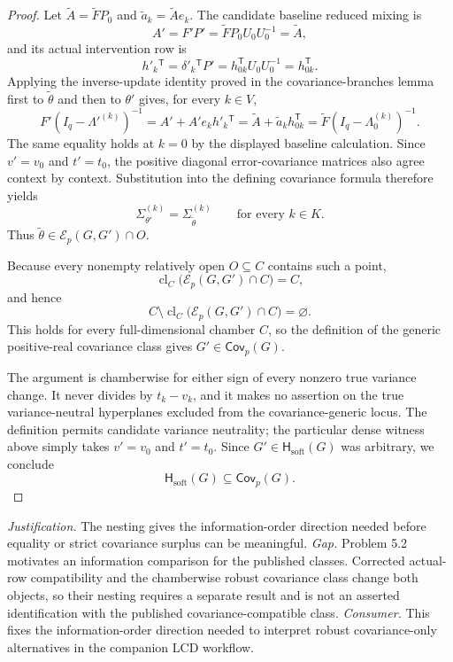 \documentclass{article}
\begin{document}
\begin{proof}
Let \(\widetilde A=\widetilde F P_0\) and \(\widetilde a_k=\widetilde A e_k\).  The candidate baseline reduced mixing is
\[
 A'=F'P'=\widetilde F P_0U_0U_0^{-1}=\widetilde A,
\]
and its actual intervention row is
\[
 h'_k{}^{\mathsf T}
 =\delta'_k{}^{\mathsf T}P'
 =h_{0k}^{\mathsf T}U_0U_0^{-1}
 =h_{0k}^{\mathsf T}.
\]
Applying the inverse-update identity proved in the covariance-branches lemma first to \(\widetilde\theta\) and then to \(\theta'\) gives, for every \(k\in V\),
\[
 F'(I_q-\Lambda'^{(k)})^{-1}
 =A'+A'e_kh'_k{}^{\mathsf T}
 =\widetilde A+\widetilde a_kh_{0k}^{\mathsf T}
 =\widetilde F(I_q-\Lambda^{(k)}_0)^{-1}.
\]
The same equality holds at \(k=0\) by the displayed baseline calculation.  Since \(v'=v_0\) and \(t'=t_0\), the positive diagonal error-covariance matrices also agree context by context.  Substitution into the defining covariance formula therefore yields
\[
 \Sigma_{\theta'}^{(k)}=\Sigma_{\widetilde\theta}^{(k)}
 \qquad\text{for every }k\in K.
\]
Thus \(\widetilde\theta\in\mathcal E_p(G,G')\cap O\).

Because every nonempty relatively open \(O\subseteq C\) contains such a point,
\[
 \operatorname{cl}_{C}\bigl(\mathcal E_p(G,G')\cap C\bigr)=C,
\]
and hence
\[
 C\setminus\operatorname{cl}_{C}\bigl(\mathcal E_p(G,G')\cap C\bigr)=\varnothing.
\]
This holds for every full-dimensional chamber \(C\), so the definition of the generic positive-real covariance class gives \(G'\in\mathsf{Cov}_p(G)\).

The argument is chamberwise for either sign of every nonzero true variance change.  It never divides by \(t_k-v_k\), and it makes no assertion on the true variance-neutral hyperplanes excluded from the covariance-generic locus.  The definition permits candidate variance neutrality; the particular dense witness above simply takes \(v'=v_0\) and \(t'=t_0\).  Since \(G'\in\mathsf H_{\mathrm{soft}}(G)\) was arbitrary, we conclude
\[
 \mathsf H_{\mathrm{soft}}(G)\subseteq\mathsf{Cov}_p(G).
\]
\end{proof}
\par\smallskip\noindent \textit{Justification.} The nesting gives the information-order direction needed before equality or strict covariance surplus can be meaningful. \textit{Gap.} Problem 5.2 motivates an information comparison for the published classes. Corrected actual-row compatibility and the chamberwise robust covariance class change both objects, so their nesting requires a separate result and is not an asserted identification with the published covariance-compatible class. \textit{Consumer.} This fixes the information-order direction needed to interpret robust covariance-only alternatives in the companion LCD workflow.
\end{document}
